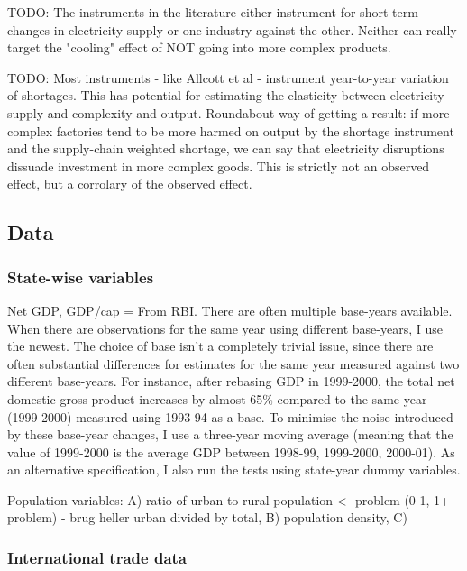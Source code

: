 \documentclass[11pt]{article}
\begin{document}
TODO: The instruments in the literature either instrument for short-term changes in electricity supply or one industry against the other. Neither can really target the "cooling" effect of NOT going into more complex products.

TODO: Most instruments - like Allcott et al - instrument year-to-year variation of shortages. This has potential for estimating the elasticity between electricity supply and complexity and output. Roundabout way of getting a result: if more complex factories tend to be more harmed on output by the shortage instrument and the supply-chain weighted shortage, we can say that electricity disruptions dissuade investment in more complex goods. This is strictly not an observed effect, but a corrolary of the observed effect.

\subsection{Data}%
\label{sub:data}

\subsubsection{State-wise variables}%
\label{sub:state_wise_variables}
Net GDP, GDP/cap = From RBI. There are often multiple base-years available. When there are observations for the same year using different base-years, I use the newest. The choice of base isn't a completely trivial issue, since there are often substantial differences for estimates for the same year measured against two different base-years. For instance, after rebasing GDP in 1999-2000, the total net domestic gross product increases by almost 65\% compared to the same year (1999-2000) measured using 1993-94 as a base. To minimise the noise introduced by these base-year changes, I use a three-year moving average (meaning that the value of 1999-2000 is the average GDP between 1998-99, 1999-2000, 2000-01). As an alternative specification, I also run the tests using state-year dummy variables.

Population variables: A) ratio of urban to rural population <- problem (0-1, 1+ problem) - brug heller urban divided by total, B) population density, C) 


\subsubsection{International trade data}%
\label{sub:international_trade_data}
\end{document}
